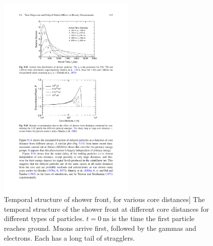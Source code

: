 \begin{figure}
    \centering
    \includegraphics[width=0.6\textwidth]
                    {plots/cosmic-rays/temporal_profile}
    \caption{Temporal structure of shower front, for various core distances]
The temporal structure of the shower front at different core distances for different types of particles. $t = \SI{0}{\ns}$ is the time the first particle reaches ground. Muons arrive first, followed by the gammas and electrons. Each has a long tail of stragglers.}
    \label{fig:temporal_profile}
\end{figure}

\,

